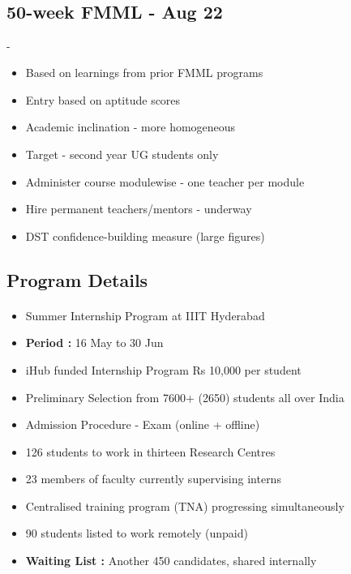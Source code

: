 \subsection{\\50-week FMML - Aug 22}

\begin{frame}[fragile=singleslide]{\insertsectionhead - \insertsubsectionhead}
\begin{center}
\begin{itemize}
\item Based on learnings from prior FMML programs
\item Entry based on aptitude scores
\item Academic inclination - more homogeneous
\item Target - second year UG students only
\item Administer course modulewise -  one teacher per module
\item Hire permanent teachers/mentors - underway
\item DST confidence-building measure (large figures)
\end{itemize}
\end{center}
\end{frame}


\subsection{Program Details}
\begin{frame}[fragile=singleslide]{\insertsectionhead}
  \framesubtitle{\insertsubsectionhead}
\begin{center}
\begin{itemize}
\item Summer Internship Program at IIIT Hyderabad
\item \textbf{Period : } 16 May to 30 Jun
\item iHub funded Internship Program Rs 10,000 per student
\item Preliminary Selection from 7600+ (2650) students all over India
\item Admission Procedure - Exam (online + offline)
\item 126 students to work in thirteen Research Centres
\item 23 members of faculty currently supervising interns
\item Centralised training program (TNA) progressing simultaneously
\item 90 students listed to work remotely (unpaid)
\item \textbf{Waiting List : } Another 450 candidates, shared internally
\end{itemize}
\end{center}
\end{frame}



